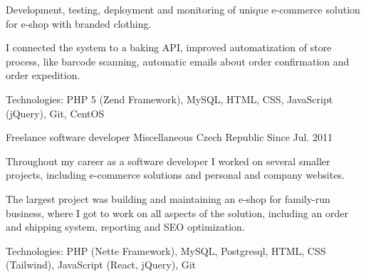 \begin{cventries}
{\begin{cvitems}
        \item {Development, testing, deployment and monitoring of unique e-commerce solution for e-shop with branded clothing.}
        \item {I connected the system to a baking API, improved automatization of store process, like barcode scanning, automatic emails about order confirmation and order expedition.}
        \item {Technologies: PHP 5 (Zend Framework), MySQL, HTML, CSS, JavaScript (jQuery), Git, CentOS}
      \end{cvitems}
    }
  \cventry
    {Freelance software developer}
    {Miscellaneous}
    {Czech Republic}
    {Since Jul. 2011}
    {
      \begin{cvitems}
        \item {Throughout my career as a software developer I worked on several smaller projects, including e-commerce solutions and personal and company websites.}
        \item {The largest project was building and maintaining an e-shop for family-run business, where I got to work on all aspects of the solution, including an order and shipping system, reporting and SEO optimization.}
        \item {Technologies: PHP (Nette Framework), MySQL, Postgresql, HTML, CSS (Tailwind), JavaScript (React, jQuery), Git}
      \end{cvitems}
    }
\end{cventries}
